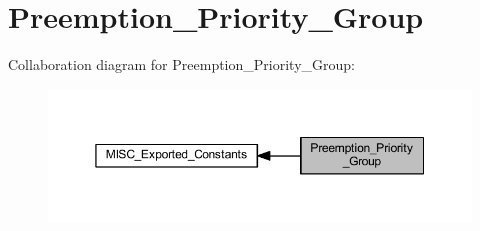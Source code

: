 \hypertarget{group___preemption___priority___group}{}\section{Preemption\+\_\+\+Priority\+\_\+\+Group}
\label{group___preemption___priority___group}
Collaboration diagram for Preemption\+\_\+\+Priority\+\_\+\+Group\+:
\nopagebreak
\begin{figure}[H]
\begin{center}
\leavevmode
\includegraphics[width=350pt]{group___preemption___priority___group}
\end{center}
\end{figure}
